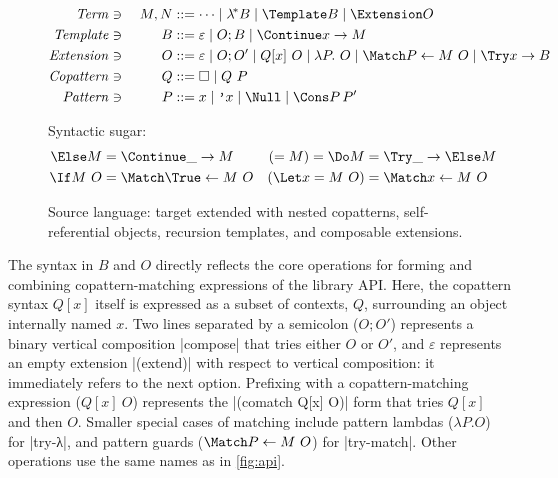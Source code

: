\begin{figure}[t]
\centering
\small
\begin{alignat*}{2}
  \mathit{Term} &\ni{}& M, N
  &::= \dots
  \mid \lamstar B
  \mid \Template B
  \mid \Extension O
  \\
  \mathit{Template} &\ni{}& B
  &::= \varepsilon
  \mid O; B
  \mid \Continue x \to M
  \\
  \mathit{Extension} &\ni{}& O
  &::= \varepsilon
  \mid O; O'
  \mid Q[x] ~ O
  \mid \lambda P.~ O
  \mid \Match P \gets M ~ O
  \mid \Try x \to B
  \\
  \mathit{Copattern} &\ni{}& Q
  &::= \hole
  \mid Q ~ P
  \\
  \mathit{Pattern} &\ni{}& P
  &::= x
  \mid \q{x}
  \mid \Null
  \mid \Cons P \, P'
\end{alignat*}

Syntactic sugar:
\begin{align*}
  \Else M
  &=
  \Continue \_ \to M
  &
  (= M)
  =
  \Do M
  &=
  \Try \_ \to \Else M
  \\
  \If M ~ O
  &=
  \Match \True \gets M ~ O
  &
  (\Let x = M ~ O)
  &=
  \Match x \gets M ~ O
\end{align*}
\caption{Source language: target extended with nested copatterns,
  self-referential objects, recursion templates, and composable extensions.}
\label{fig:source-syntax}
\end{figure}

The syntax in $B$ and $O$ directly reflects the core operations for forming and combining copattern-matching expressions of the library API.
Here, the copattern syntax $Q[x]$ itself is expressed as a subset of contexts, $Q$, surrounding an object internally named $x$.
Two lines separated by a semicolon ($O; O'$) represents a binary vertical composition \scm|compose| that tries either $O$ or $O'$, 
and $\varepsilon$ represents an empty extension \scm|(extend)| with respect to vertical composition: it immediately refers to the next option.
Prefixing with a copattern-matching expression ($Q[x] ~ O$) represents the \scm|(comatch Q[x] O)| form that tries $Q[x]$ and then $O$.
Smaller special cases of matching include pattern lambdas ($\lambda P. O$) for \scm|try-λ|, and pattern guards ($\Match P \gets M ~ O$) for \scm|try-match|.
Other operations use the same names as in \cref{fig:api}.

